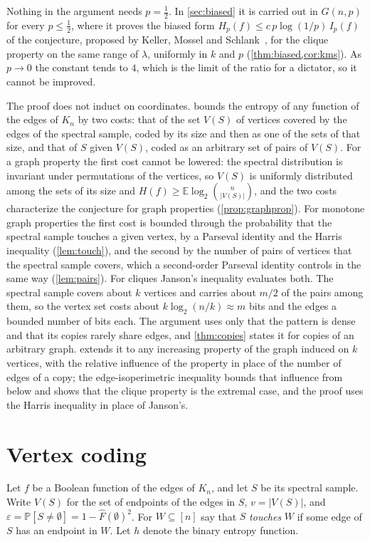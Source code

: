 \documentclass[11pt]{amsart}
\theoremstyle{remark}
\newcommand{\E}{\mathbb{E}}
\renewcommand{\Pr}{\mathbb{P}}
\newcommand{\eps}{\varepsilon}
\begin{document}
Nothing in the argument needs $p=\frac12$. In \cref{sec:biased} it is carried out in $G(n,p)$ for every $p\le\frac12$,
where it proves the biased form $H_p(f)\le c\,p\log(1/p)\,I_p(f)$ of the conjecture, proposed by Keller, Mossel
and Schlank~\cite{KMS12}, for the clique property on the same range of $\lambda$, uniformly in $k$ and $p$
(\cref{thm:biased,cor:kms}). As $p\to0$ the constant tends to $4$, which is the limit of the ratio for a dictator,
so it cannot be improved.

The proof does not induct on coordinates.  bounds the entropy of any function of the edges of $K_n$
by two costs: that of the set $V(S)$ of vertices covered by the edges of the spectral sample, coded by its size and
then as one of the sets of that size, and that of $S$ given $V(S)$, coded as an arbitrary set of pairs of $V(S)$. For
a graph property the first cost cannot be lowered: the spectral distribution is invariant under permutations of the
vertices, so $V(S)$ is uniformly distributed among the sets of its size and $H(f)\ge\E\log_2\binom n{|V(S)|}$, and
the two costs characterize the conjecture for graph properties (\cref{prop:graphprop}). For monotone graph properties
the first cost is bounded through the probability that the spectral sample touches a given vertex, by a Parseval
identity and the Harris inequality (\cref{lem:touch}), and the second by the number of pairs of vertices that the
spectral sample covers, which a second-order Parseval identity controls in the same way (\cref{lem:pairs}). For cliques Janson's
inequality evaluates both. The spectral sample covers about $k$ vertices and carries about $m/2$ of the pairs among
them, so the vertex set costs about $k\log_2(n/k)\approx m$ bits and the edges a bounded number of bits each. The
argument uses only that the pattern is dense and that its copies rarely share edges, and \cref{thm:copies} states it
for copies of an arbitrary graph.  extends it to any increasing property of the graph induced on $k$
vertices, with the relative influence of the property in place of the number of edges of a copy; the
edge-isoperimetric inequality bounds that influence from below and shows that the clique property is the extremal
case, and the proof uses the Harris inequality in place of Janson's.

\section{Vertex coding}

Let $f$ be a Boolean function of the edges of $K_n$, and let $S$ be its spectral sample. Write $V(S)$ for the set of
endpoints of the edges in $S$, $v=|V(S)|$, and $\eps=\Pr[S\neq\emptyset]=1-\widehat F(\emptyset)^2$. For
$W\subseteq[n]$ say that $S$ \emph{touches} $W$ if some edge of $S$ has an endpoint in $W$. Let $h$ denote the binary
entropy function.
\end{document}
